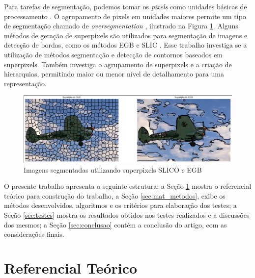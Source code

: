 \begin{document}
Para tarefas de segmentação, podemos tomar os \textit{pixels} como unidades básicas de processamento \cite{WANG201728}. O agrupamento de pixels em unidades maiores permite um tipo de segmentação chamado de \textit{oversegmentation} \cite{WANG201728}, ilustrado na Figura \ref{fig:superpixel}. Alguns métodos de geração de superpixels são utilizados para segmentação de imagens e detecção de bordas, como os métodos EGB \cite{FELZENSZWALB} e SLIC \cite{SLIC}. Esse trabalho investiga se a utilização de métodos segmentação e detecção de contornos baseados em superpixels. Também investiga o agrupamento de superpixels e a criação de hierarquias, permitindo maior ou menor nível de detalhamento para uma representação.

\begin{figure}[ht]
\centering
\includegraphics[width=1.\textwidth]{superpixels.png}
\caption{Imagens segmentadas utilizando superpixels SLICO e EGB}
\label{fig:superpixel}
\end{figure}

O presente trabalho apresenta a seguinte estrutura: a Seção \ref{sec:ref_teorico} mostra o referencial teórico para construção do trabalho, a Seção \ref{sec:mat_metodos}, exibe os métodos desenvolvidos, algoritmos e os critérios para elaboração dos testes; a Seção \ref{sec:testes} mostra os resultados obtidos nos testes realizados e a discussões dos mesmos; a Seção \ref{sec:conclusao} contém a conclusão do artigo, com as considerações finais.



\section{Referencial Teórico} \label{sec:ref_teorico}

\end{document}
